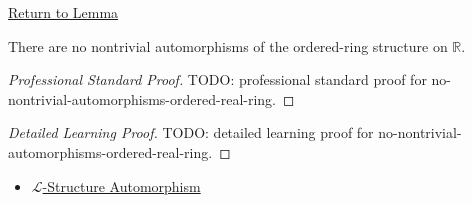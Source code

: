 \newpage
{}
\label{prf:no-nontrivial-automorphisms-ordered-real-ring}

\begin{remark*}[Return]
\hyperref[lem:no-nontrivial-automorphisms-ordered-real-ring]{Return to Lemma}
\end{remark*}

\begin{lemma*}
There are no nontrivial automorphisms of the ordered-ring structure on
$\mathbb{R}$.
\end{lemma*}

\begin{proof}[Professional Standard Proof]
\LRAProofBodyStart
TODO: professional standard proof for no-nontrivial-automorphisms-ordered-real-ring.
\end{proof}

\begin{proof}[Detailed Learning Proof]
\LRAProofBodyStart
TODO: detailed learning proof for no-nontrivial-automorphisms-ordered-real-ring.
\end{proof}

\begin{remark*}
\end{remark*}

\begin{dependencies}
\begin{itemize}
  \item \hyperref[def:l-structure-automorphism]{$\mathcal{L}$-Structure Automorphism}
\end{itemize}
\end{dependencies}

\clearpage
